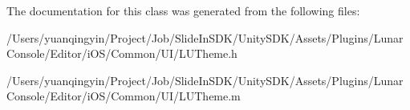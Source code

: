 The documentation for this class was generated from the following files\+:\begin{DoxyCompactItemize}
\item 
/\+Users/yuanqingyin/\+Project/\+Job/\+Slide\+In\+S\+D\+K/\+Unity\+S\+D\+K/\+Assets/\+Plugins/\+Lunar\+Console/\+Editor/i\+O\+S/\+Common/\+U\+I/L\+U\+Theme.\+h\item 
/\+Users/yuanqingyin/\+Project/\+Job/\+Slide\+In\+S\+D\+K/\+Unity\+S\+D\+K/\+Assets/\+Plugins/\+Lunar\+Console/\+Editor/i\+O\+S/\+Common/\+U\+I/L\+U\+Theme.\+m\end{DoxyCompactItemize}
